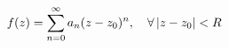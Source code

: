 \documentclass[preview]{standalone}
\begin{document}
\begin{align*}
\special{dvisvgm:raw <g id='unique000'>}f(z) = \sum_{n=0}^{\infty} a_n (z-z_0)^n, \quad \forall\, |z-z_0| < R\special{dvisvgm:raw </g>}
\end{align*}
\end{document}
